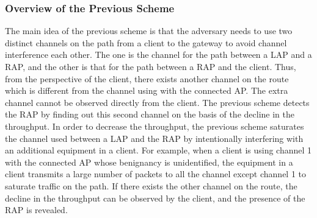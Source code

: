 \documentclass[paper]{ieice}
\begin{document}
\subsubsection{Overview of the Previous Scheme}
The main idea of the previous scheme \cite{previous} is that the adversary needs to use two distinct channels on the path from a client to the gateway to avoid channel interference each other.
The one is the channel for the path between a LAP and a RAP, and the other is that for the path between a RAP and the client.
Thus, from the perspective of the client, there exists another channel on the route which is different from the channel using with the connected AP.
The extra channel cannot be observed directly from the client.
The previous scheme detects the RAP by finding out this second channel on the basis of the decline in the throughput.
In order to decrease the throughput, the previous scheme saturates the channel used between a LAP and the RAP by intentionally interfering with an additional equipment in a client.
For example, when a client is using channel 1 with the connected AP whose benignancy is unidentified, the equipment in a client transmits a large number of packets to all the channel except channel 1 to saturate traffic on the path.
If there exists the other channel on the route, the decline in the throughput can be observed by the client, and the presence of the RAP is revealed.
\end{document}
